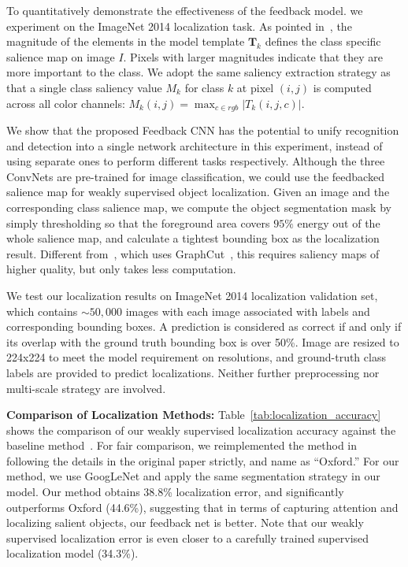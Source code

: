 To quantitatively demonstrate the effectiveness of the feedback model. we experiment on the ImageNet 2014 localization task. As pointed in~\cite{simonyan2013deep}, the magnitude of the elements in the model template $\mathbf{T}_k$ defines the class specific salience map on image $I$. Pixels with larger magnitudes indicate that they are more important to the class. We adopt the same saliency extraction strategy as~\cite{simonyan2013deep} that a single class saliency value $M_k$ for class $k$ at pixel $(i,j)$ is computed across all color channels: $M_k(i,j) = \max_{c \in rgb} | T_k(i,j,c) |$.

We show that the proposed Feedback CNN has the potential to unify recognition and detection into a single network architecture in this experiment, instead of using separate ones to perform different tasks respectively. Although the three ConvNets are pre-trained for image classification, we could use the feedbacked salience map for weakly supervised object localization. Given an image and the corresponding class salience map, we compute the object segmentation mask by simply thresholding so that the foreground area covers $95\%$ energy out of the whole salience map, and calculate a tightest bounding box as the localization result. Different from~\cite{simonyan2013deep}, which uses GraphCut~\cite{yuri2001interactive}, this requires saliency maps of higher quality, but only takes less computation.

We test our localization results on ImageNet 2014 localization validation set, which contains $\sim50,000$ images with each image associated with labels and corresponding bounding boxes. A prediction is considered as correct if and only if its overlap with the ground truth bounding box is over 50\%. Image are resized  to 224x224 to meet the model requirement on resolutions, and ground-truth class labels are provided to predict localizations. Neither further preprocessing nor multi-scale strategy are involved.

\textbf{Comparison of Localization Methods:} Table~\ref{tab:localization_accuracy} shows the comparison of our weakly supervised localization accuracy against the baseline method~\cite{simonyan2013deep}. For fair comparison, we reimplemented the method in~\cite{simonyan2013deep} following the details in the original paper strictly, and name as ``Oxford.'' For our method, we use GoogLeNet and apply the same segmentation strategy in our model. Our method obtains 38.8\% localization error, and significantly outperforms Oxford (44.6\%), suggesting that in terms of capturing attention and localizing salient objects, our feedback net is better. Note that our weakly supervised localization error is even closer to a carefully trained supervised localization model (34.3\%).


